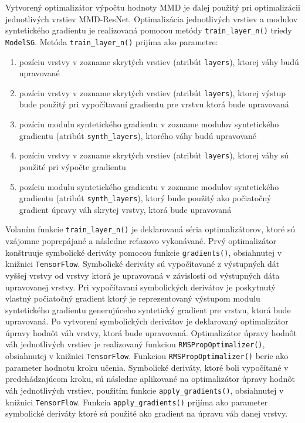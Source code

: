 Vytvorený optimalizátor výpočtu hodnoty MMD je ďalej použitý pri optimalizácii jednotlivých vrstiev MMD-ResNet. Optimalizácia jednotlivých vrstiev a modulov syntetického gradientu  je realizovaná pomocou metódy \texttt{train_layer_n()} triedy \texttt{ModelSG}. Metóda \texttt{train_layer_n()} prijíma ako parametre:
\begin{enumerate}
    \item pozíciu vrstvy v zozname skrytých vrstiev (atribút \texttt{layers}), ktorej váhy budú upravované 
    \item pozíciu vrstvy v zozname skrytých vrstiev (atribút \texttt{layers}), ktorej výstup bude použitý pri vypočítavaní gradientu pre vrstvu ktorá bude upravovaná
    \item pozíciu modulu syntetického gradientu v zozname modulov syntetického gradientu (atribút \texttt{synth_layers}), ktorého váhy budú upravované
    \item pozíciu vrstvy v zozname skrytých vrstiev (atribút \texttt{layers}), ktorej váhy sú použité pri výpočte gradientu
    \item pozíciu modulu syntetického gradientu v zozname modulov syntetického gradientu (atribút \texttt{synth_layers}), ktorý bude použitý ako počiatočný gradient úpravy váh skrytej vrstvy, ktorá bude upravovaná
\end{enumerate}
Volaním funkcie \texttt{train_layer_n()} je deklarovaná séria optimalizátorov, ktoré sú vzájomne poprepájané a následne reťazovo vykonávané. Prvý optimalizátor konštruuje symbolické deriváty pomocou funkcie \texttt{gradients()}, obsiahnutej v knižnici \texttt{TensorFlow}. Symbolické deriváty sú vypočítavané z výstupných dát vyššej vrstvy od vrstvy ktorá je upravovaná v závislosti od výstupných dáta upravovanej vrstvy. Pri vypočítavaní symbolických derivátov je poskytnutý vlastný počiatočný gradient ktorý je reprezentovaný výstupom modulu syntetického gradientu generujúceho syntetický gradient pre vrstvu, ktorá bude upravovaná. Po vytvorení symbolických derivátov je deklarovaný optimalizátor úpravy hodnôt váh vrstvy, ktorá bude upravovaná. Optimalizátor úpravy hodnôt váh jednotlivých vrstiev je realizovaný funkciou \texttt{RMSPropOptimalizer()}, obsiahnutej v knižnici \texttt{TensorFlow}. Funkciou \texttt{RMSPropOptimalizer()} berie ako parameter hodnotu kroku učenia. Symbolické deriváty, ktoré boli vypočítané v predchádzajúcom kroku, sú následne aplikované na optimalizátor úpravy hodnôt váh jednotlivých vrstiev, použitím funkcie \texttt{apply_gradients()}, obsiahnutej v knižnici \texttt{TensorFlow}. Funkcia \texttt{apply_gradients()} prijíma ako parameter symbolické deriváty ktoré sú použité ako gradient na úpravu váh danej vrstvy. 

